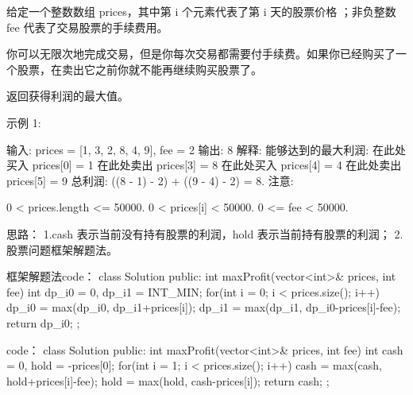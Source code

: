 给定一个整数数组 prices，其中第 i 个元素代表了第 i 天的股票价格 ；非负整数 fee 代表了交易股票的手续费用。

你可以无限次地完成交易，但是你每次交易都需要付手续费。如果你已经购买了一个股票，在卖出它之前你就不能再继续购买股票了。

返回获得利润的最大值。

示例 1:

输入: prices = [1, 3, 2, 8, 4, 9], fee = 2
输出: 8
解释: 能够达到的最大利润:  
在此处买入 prices[0] = 1
在此处卖出 prices[3] = 8
在此处买入 prices[4] = 4
在此处卖出 prices[5] = 9
总利润: ((8 - 1) - 2) + ((9 - 4) - 2) = 8.
注意:

0 < prices.length <= 50000.
0 < prices[i] < 50000.
0 <= fee < 50000.

























思路：
1.cash 表示当前没有持有股票的利润，hold 表示当前持有股票的利润；
2.股票问题框架解题法。
















框架解题法code：
class Solution {
public:
    int maxProfit(vector<int>& prices, int fee) {
        int dp_i0 = 0, dp_i1 = INT_MIN;
        for(int i = 0; i < prices.size(); i++)
        {
            dp_i0 = max(dp_i0, dp_i1+prices[i]);
            dp_i1 = max(dp_i1, dp_i0-prices[i]-fee);
        }
        return dp_i0;
    }
};





















code：
class Solution {
public:
    int maxProfit(vector<int>& prices, int fee) {
        int cash = 0, hold = -prices[0];
        for(int i = 1; i < prices.size(); i++)
        {
            cash = max(cash, hold+prices[i]-fee);
            hold = max(hold, cash-prices[i]);
        }
        return cash;
    }
};